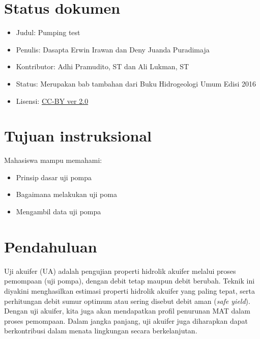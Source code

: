 \section{Status dokumen}

\begin{itemize}
\item Judul: Pumping test
\end{itemize}
\begin{itemize}
\item Penulis: Dasapta Erwin Irawan dan Deny Juanda Puradimaja
\end{itemize}
\begin{itemize}
\item Kontributor: Adhi Pramudito, ST dan Ali Lukman, ST
\end{itemize}
\begin{itemize}
\item Status: Merupakan bab tambahan dari Buku Hidrogeologi Umum Edisi 2016
\end{itemize}
\begin{itemize}
\item Lisensi: \href{http://creativecommons.org/licenses/by/2.0/}{CC-BY ver 2.0}
\end{itemize}



\section{Tujuan instruksional} 

Mahasiswa mampu memahami:
\begin{itemize}
\item Prinsip dasar uji pompa
\end{itemize}
\begin{itemize}
\item Bagaimana melakukan uji poma
\end{itemize}
\begin{itemize}
\item Mengambil data uji pompa
\end{itemize}


\section{Pendahuluan}

Uji akuifer (UA) adalah pengujian properti hidrolik akuifer melalui proses pemompaan (uji pompa), dengan debit tetap maupun debit berubah. Teknik ini diyakini menghasilkan estimasi properti hidrolik akuifer yang paling tepat, serta perhitungan debit sumur optimum atau sering disebut debit aman (\textit{safe yield}). Dengan uji akuifer, kita juga akan mendapatkan profil penurunan MAT dalam proses pemompaan. Dalam jangka panjang, uji akuifer juga diharapkan dapat berkontribusi dalam menata lingkungan secara berkelanjutan.


